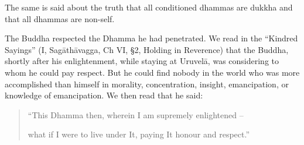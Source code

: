 The same is said about the truth that all conditioned dhammas are dukkha
and that all dhammas are non-self.

The Buddha respected the Dhamma he had penetrated. We read in the
``Kindred Sayings'' (I, Sagāthāvagga, Ch VI, §2, Holding in Reverence)
that the Buddha, shortly after his enlightenment, while staying at
Uruvelā, was considering to whom he could pay respect. But he could find
nobody in the world who was more accomplished than himself in morality,
concentration, insight, emancipation, or knowledge of emancipation. We
then read that he said:

\begin{quote}
``This Dhamma then, wherein I am supremely enlightened --

what if I were to live under It, paying It honour and respect.''
\end{quote}

